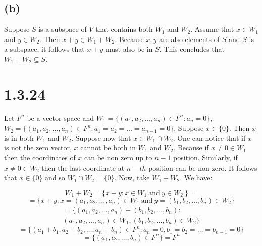 \documentclass{article}
\begin{document}
\subsection*{(b)}

Suppose \(S\) is a subspace of \(V\) that contains both \(W_{1}\) and \(W_{2}\).
Assume that \(x \in W_{1}\) and \(y \in W_{2}\). Then \(x + y \in W_{1} + W_{2}\).
Because \(x , y\) are also elements of \(S\) and \(S\) is a subspace, it follows that \(x + y\) must also be in
\(S\). This concludes that \(W_{1} + W_{2} \subseteq S\).


\section*{1.3.24}

Let \(F^{n}\) be a vector space and \(W_{1} = \{(a_{1}, a_{2}, \dots, a_{n}) \in F^{n}: a_{n} = 0\}\),
\(W_{2} = \{(a_{1}, a_{2}, \dots, a_{n}) \in F^{n}: a_{1} = a_{2} = \dots = a_{n-1} = 0\}\). Suppose
\(x \in \{0\}\). Then \(x\) is in both \(W_{1}\) and \(W_{2}\). Suppose now that \(x \in W_{1} \cap W_{2}\).
One can notice that if \(x\) is not the zero vector, \(x\) cannot be both in \(W_{1}\) and \(W_{2}\).
Because if \(x \neq 0 \in W_{1}\) then the coordinates of \(x\) can be non zero up to \(n-1\) position. Similarly,
if \(x \neq 0 \in W_{2}\) then the last coordinate at \(n-th\) position can be non zero. It follows that
\(x \in \{0\}\) and so \(W_{1} \cap W_{2} = \{0\}\). Now, take \(W_{1} + W_{2}\). We have:

\begin{equation*}
    W_{1} + W_{2} = \{x + y: x \in W_{1} \ \mbox{and} \ y \in W_{2}\ \} =
\end{equation*}
\begin{equation*}
    = \{x + y: x = (a_{1}, a_{2}, \dots, a_{n}) \in W_{1} \ \mbox{and} \ y = (b_{1}, b_{2}, \dots, b_{n}) \in W_{2} \}
\end{equation*}
\begin{multline*}
    = \Big\{(a_{1}, a_{2}, \dots, a_{n}) + (b_{1}, b_{2}, \dots, b_{n}): \\ (a_{1}, a_{2}, \dots, a_{n}) \in W_{1},  (b_{1}, b_{2}, 
     \dots, b_{n}) \in W_{2}\Big\}
\end{multline*}
\begin{equation*}
    = \{(a_{1} + b_{1}, a_{2} + b_{2}, \dots, a_{n} + b_{n}) \in F^{n}: a_{n} = 0, b_{1} = b_{2} = \dots = b_{n-1} = 0 \}
\end{equation*}
\begin{equation*}
    = \{(a_{1}, a_{2}, \dots, b_{n}) \in F^{n}\} = F^{n}
\end{equation*}
\end{document}

